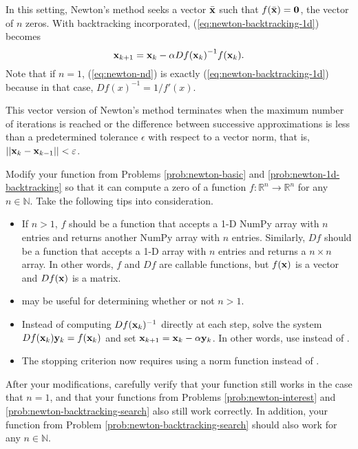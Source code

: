 In this setting, Newton's method seeks a vector $\bar{\mathbf{x}}$ such that $f(\bar{\mathbf{x}}) = \mathbf{0}$, the vector of $n$ zeros.
With backtracking incorporated, (\ref{eq:newton-backtracking-1d}) becomes
\begin{equation}
\mathbf{x}_{k+1} = \mathbf{x}_k - \alpha{Df(\mathbf{x}_k)}^{-1}{f(\mathbf{x}_k)}.
\label{eq:newton-nd}
\end{equation}
Note that if $n = 1$, (\ref{eq:newton-nd}) is exactly (\ref{eq:newton-backtracking-1d}) because in that case, $Df(x)^{-1} = 1/f'(x)$.

This vector version of Newton's method terminates when the maximum number of iterations is reached or the difference between successive approximations is less than a predetermined tolerance $\epsilon$ with respect to a vector norm, that is, $||\mathbf{x}_k - \mathbf{x}_{k-1}|| < \varepsilon$.

\begin{problem} %
Modify your function from Problems \ref{prob:newton-basic} and \ref{prob:newton-1d-backtracking} so that it can compute a zero of a function $f:\mathbb{R}^n\rightarrow\mathbb{R}^n$ for any $n\in\mathbb{N}$.
Take the following tips into consideration.
\begin{itemize}
\item If $n > 1$, $f$ should be a function that accepts a 1-D NumPy array with $n$ entries and returns another NumPy array with $n$ entries.
Similarly, $Df$ should be a function that accepts a 1-D array with $n$ entries and returns a $n\times n$ array.
In other words, $f$ and $Df$ are callable functions, but $f(\mathbf{x})$ is a vector and $Df(\mathbf{x})$ is a matrix.

\item {} may be useful for determining whether or not $n > 1$.

\item Instead of computing $Df(\mathbf{x}_k)^{-1}$ directly at each step, solve the system $Df(\mathbf{x}_k)\mathbf{y}_k = f(\mathbf{x}_k)$ and set $\mathbf{x}_{k+1} = \mathbf{x}_k - \alpha\mathbf{y}_k$.
In other words, use  instead of .

\item The stopping criterion now requires using a norm function instead of .
\end{itemize}

After your modifications, carefully verify that your function still works in the case that $n=1$, and that your functions from Problems \ref{prob:newton-interest} and \ref{prob:newton-backtracking-search} also still work correctly.
In addition, your function from Problem \ref{prob:newton-backtracking-search} should also work for any $n \in \mathbb{N}$.
\label{prob:newton-nd-implementation}
\end{problem}

